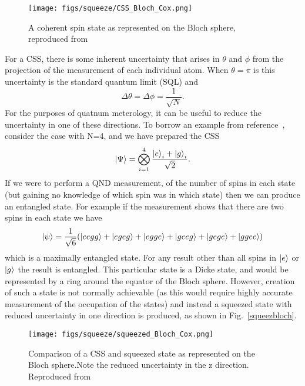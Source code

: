 \documentclass{article}
\begin{document}
\begin{figure}
  \centering
  \texttt{[image: figs/squeeze/CSS\_Bloch\_Cox.png]}
  \caption{A coherent spin state as represented on the Bloch sphere,
  reproduced from~\cite{Cox2016}}
  \label{CSSbloch}
\end{figure}

For a CSS, there is some inherent uncertainty that arises in $\theta$ and
$\phi$ from the projection of the measurement of each individual atom. When
$\theta=\pi$ is this uncertainty is the standard quantum limit (SQL) and
~\cite{Cox2016}
\begin{equation}
  \Delta \theta = \Delta \phi = \frac{1}{\sqrt{N}}.
\end{equation}
%
For the purposes of quatnum meterology, it can be useful to reduce the
uncertainty in one of these directions. To borrow an example from
reference~\cite{}, consider the case with N=4, and we have prepared the CSS
%
\begin{equation}
  \ket{\Psi} = \bigotimes_{i=1}^4 \frac{\ket{e}_i + \ket{g}_i}{\sqrt{2}}.
\end{equation}
%
If we were to perform a QND measurement, of the number of spins in each state
(but gaining no knowledge of which spin was in which state)
then we can produce an
entangled state. For example if the measurement shows that there are two spins
in each state we have
%
\begin{equation}
\ket{\psi} = \frac{1}{\sqrt{6}}(\ket{eegg} + \ket{egeg} + \ket{egge} +
\ket{geeg} + \ket{gege} + \ket{ggee})
\end{equation}
which is a maximally entangled state. For any result other than all spins in
$\ket{e}$ or $\ket{g}$ the result is entangled. This particular state is a
Dicke state, and would be represented by a ring around the equator of the Bloch
sphere. However, creation of such a state is not normally achievable (as this
would require highly accurate measurement of the occupation of the states) and
instead a squeezed state with reduced uncertainty in one direction is produced,
as shown in Fig.~\ref{squeezbloch}.

\begin{figure}
  \centering
  \texttt{[image: figs/squeeze/squeezed\_Bloch\_Cox.png]}
  \caption{Comparison of a CSS and squeezed state as represented on the Bloch
  sphere.Note the reduced uncertainty in the z direction.  Reproduced
  from~\cite{Cox2016}}
  \label{squeezebloch}
\end{figure}
\end{document}
